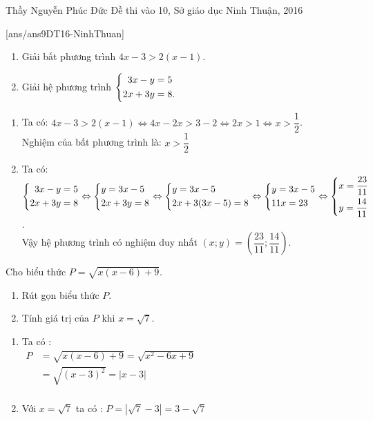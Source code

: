\begin{name}
{Thầy  Nguyễn Phúc Đức}
{Đề thi vào 10, Sở giáo dục Ninh Thuận, 2016}
\end{name}
\setcounter{ex}{0}
[ans/ans9DT16-NinhThuan]
\begin{ex}%
    \hfill
    
     \begin{enumerate}
        \item Giải bất phương trình $4x-3>2(x-1)$.
        \item Giải hệ phương trình $\left\{\begin{aligned}3x-y&=5\\ 2x+3y&=8.\end{aligned}\right.$
    \end{enumerate}
\loigiai
    {
    \begin{enumerate}
        \item Ta có: $4x-3>2(x-1)\Leftrightarrow 4x-2x>3-2\Leftrightarrow 2x>1\Leftrightarrow x>\dfrac{1}{2}$.\\
        Nghiệm của bất phương trình là: $x>\dfrac{1}{2}$
        \item Ta có: $\left\{\begin{aligned}3x-y&=5\\ 2x+3y&=8\end{aligned}\right.\Leftrightarrow \left\{\begin{aligned}&y=3x-5\\ &2x+3y=8\end{aligned}\right.\Leftrightarrow \left\{\begin{aligned}&y=3x-5\\ &2x+3(3x-5)=8\end{aligned}\right.\Leftrightarrow \left\{\begin{aligned}&y=3x-5\\ &11x=23\end{aligned}\right.\Leftrightarrow \left\{\begin{aligned}&x=\dfrac{23}{11}\\ &y=\dfrac{14}{11}\end{aligned}\right.$.\\
        Vậy hệ phương trình có nghiệm duy nhất $(x; y)=\left(\dfrac{23}{11}; \dfrac{14}{11}\right)$.
    \end{enumerate}
    }
\end{ex}

\begin{ex}%
Cho biểu thức $P=\sqrt{x(x-6)+9}$.
    \begin{enumerate}    
        \item Rút gọn biểu thức $P$.
        \item Tính giá trị của $P$ khi $x=\sqrt{7}$.
    \end{enumerate}
\loigiai
    {
    \begin{enumerate}
        \item Ta có :\\
        $\begin{aligned}
        P&=\sqrt{x(x-6)+9}=\sqrt{x^2-6x+9}\\
        &=\sqrt{(x-3)^2}=\left|x-3\right|\\
      \end{aligned}$
        \item Với $x=\sqrt{7}$ ta có : $P=\left|\sqrt{7}-3\right|=3-\sqrt{7}$ 
       \end{enumerate}
    }
\end{ex}

